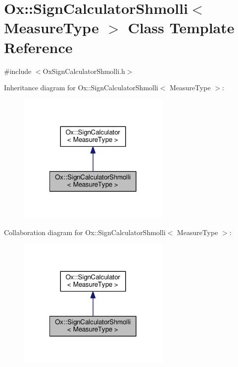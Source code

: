 \hypertarget{class_ox_1_1_sign_calculator_shmolli}{\section{Ox\-:\-:Sign\-Calculator\-Shmolli$<$ Measure\-Type $>$ Class Template Reference}
\label{class_ox_1_1_sign_calculator_shmolli}
}


{\ttfamily \#include $<$Ox\-Sign\-Calculator\-Shmolli.\-h$>$}



Inheritance diagram for Ox\-:\-:Sign\-Calculator\-Shmolli$<$ Measure\-Type $>$\-:
\nopagebreak
\begin{figure}[H]
\begin{center}
\leavevmode
\includegraphics[width=210pt]{class_ox_1_1_sign_calculator_shmolli__inherit__graph}
\end{center}
\end{figure}


Collaboration diagram for Ox\-:\-:Sign\-Calculator\-Shmolli$<$ Measure\-Type $>$\-:
\nopagebreak
\begin{figure}[H]
\begin{center}
\leavevmode
\includegraphics[width=210pt]{class_ox_1_1_sign_calculator_shmolli__coll__graph}
\end{center}
\end{figure}
